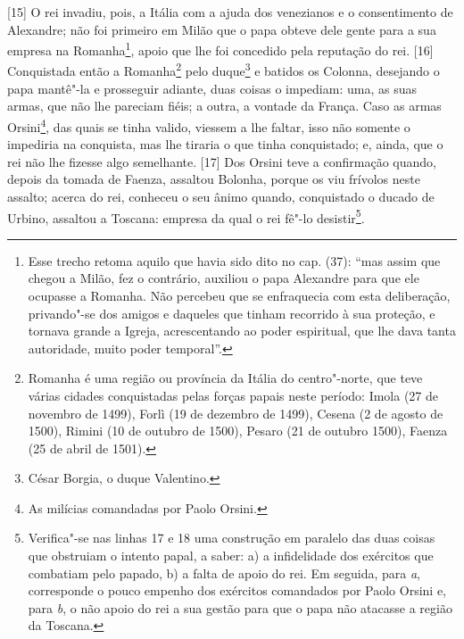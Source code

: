 {[}15{]} O rei invadiu, pois, a Itália com a ajuda dos venezianos e o
consentimento de Alexandre; não foi primeiro em Milão que o papa obteve
dele gente para a sua empresa na Romanha\footnote{Esse trecho retoma
  aquilo que havia sido dito no cap.  (37): ``mas assim que chegou a
  Milão, fez o contrário, auxiliou o papa Alexandre para que ele
  ocupasse a Romanha. Não percebeu que se enfraquecia com esta
  deliberação, privando"-se dos amigos e daqueles que tinham recorrido à
  sua proteção, e tornava grande a Igreja, acrescentando ao poder
  espiritual, que lhe dava tanta autoridade, muito poder temporal''.},
apoio que lhe foi concedido pela reputação do rei. {[}16{]} Conquistada
então a Romanha\footnote{Romanha é uma região ou província da Itália do
  centro"-norte, que teve várias cidades conquistadas pelas forças papais
  neste período: Imola (27 de novembro de 1499), Forlì (19 de dezembro
  de 1499), Cesena (2 de agosto de 1500), Rimini (10 de outubro de
  1500), Pesaro (21 de outubro 1500), Faenza (25 de abril de 1501).}
pelo duque\footnote{César Borgia, o duque Valentino.} e batidos os
Colonna, desejando o papa mantê"-la e prosseguir adiante, duas coisas o
impediam: uma, as suas armas, que não lhe pareciam fiéis; a outra, a
vontade da França. Caso as armas Orsini\footnote{As milícias comandadas
  por Paolo Orsini.}, das quais se tinha valido, viessem a lhe faltar,
isso não somente o impediria na conquista, mas lhe tiraria o que tinha
conquistado; e, ainda, que o rei não lhe fizesse algo semelhante.
{[}17{]} Dos Orsini teve a confirmação quando, depois da tomada de
Faenza, assaltou Bolonha, porque os viu frívolos neste assalto; acerca
do rei, conheceu o seu ânimo quando, conquistado o ducado de Urbino,
assaltou a Toscana: empresa da qual o rei fê"-lo desistir\footnote{Verifica"-se
  nas linhas 17 e 18 uma construção em paralelo das duas coisas que
  obstruiam o intento papal, a saber: a) a infidelidade dos exércitos
  que combatiam pelo papado, b) a falta de apoio do rei. Em seguida,
  para \emph{a}, corresponde o pouco empenho dos exércitos comandados
  por Paolo Orsini e, para \emph{b}, o não apoio do rei a sua gestão
  para que o papa não atacasse a região da Toscana.}.

